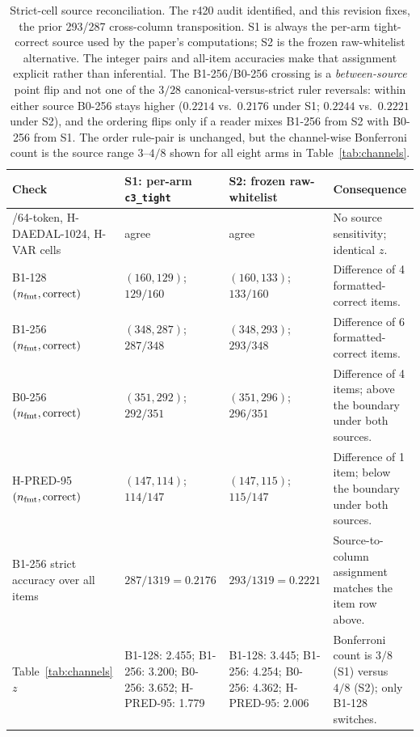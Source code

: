 \documentclass{article}
\begin{document}
\begin{table}[H]
\centering\footnotesize
\setlength{\tabcolsep}{3pt}
\begin{tabular}{@{}>{\raggedright\arraybackslash}p{3.0cm}
                    >{\raggedright\arraybackslash}p{3.0cm}
                    >{\raggedright\arraybackslash}p{3.0cm}
                    >{\raggedright\arraybackslash}p{4.2cm}@{}}
\toprule
Check & S1: per-arm \texttt{c3\_tight} & S2: frozen raw-whitelist & Consequence \\
\midrule
32/64-token, \textsc{H-DAEDAL-1024}, \textsc{H-VAR} cells & agree & agree & No source sensitivity; identical $z$. \\
\textsc{B1-128} $(n_{\rm fmt},\mathrm{correct})$ & $(160,129)$; $129/160$ & $(160,133)$; $133/160$ & Difference of 4 formatted-correct items. \\
\textsc{B1-256} $(n_{\rm fmt},\mathrm{correct})$ & $(348,287)$; $287/348$ & $(348,293)$; $293/348$ & Difference of 6 formatted-correct items. \\
\textsc{B0-256} $(n_{\rm fmt},\mathrm{correct})$ & $(351,292)$; $292/351$ & $(351,296)$; $296/351$ & Difference of 4 items; above the boundary under both sources. \\
\textsc{H-PRED-95} $(n_{\rm fmt},\mathrm{correct})$ & $(147,114)$; $114/147$ & $(147,115)$; $115/147$ & Difference of 1 item; below the boundary under both sources. \\
\textsc{B1-256} strict accuracy over all items & $287/1319=0.2176$ & $293/1319=0.2221$ & Source-to-column assignment matches the item row above. \\
Table~\ref{tab:channels} $z$ & B1-128: 2.455; B1-256: 3.200; B0-256: 3.652; H-PRED-95: 1.779 & B1-128: 3.445; B1-256: 4.254; B0-256: 4.362; H-PRED-95: 2.006 & Bonferroni count is $3/8$ (S1) versus $4/8$ (S2); only B1-128 switches. \\
\bottomrule
\end{tabular}
\caption{Strict-cell source reconciliation.  The r420 audit identified, and
this revision fixes, the prior
293/287 cross-column transposition.  S1 is always the per-arm tight-correct
source used by the paper's computations; S2 is the frozen raw-whitelist
alternative.  The integer pairs and all-item accuracies make that assignment
explicit rather than inferential.  The \textsc{B1-256}/\textsc{B0-256}
crossing is a \emph{between-source} point flip and not one of the $3/28$
canonical-versus-strict ruler reversals: within either source
\textsc{B0-256} stays higher ($0.2214$ vs.\ $0.2176$ under S1; $0.2244$ vs.\
$0.2221$ under S2), and the ordering flips only if a reader mixes
\textsc{B1-256} from S2 with \textsc{B0-256} from S1.  The order rule-pair is
unchanged, but the channel-wise Bonferroni count is the source range
$3$--$4/8$ shown for all eight arms in Table~\ref{tab:channels}.}
\label{tab:strict-reconciliation}
\end{table}
\end{document}
